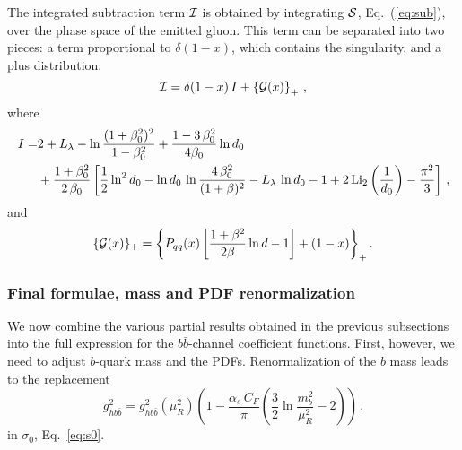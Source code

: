 The integrated subtraction term ${\cal I}$ is obtained by
integrating  ${\cal S}$, Eq.~(\ref{eq:sub}),  over the phase space of
the emitted gluon. This term can be separated into two pieces: a term
proportional to 
$\delta(1-x)$, which contains the singularity,
and a plus distribution:
\begin{equation}
  {\cal I} = \delta(1-x)\,I + \left\{ {\cal G}(x) \right\}_+\,,
\end{equation}
where
\begin{equation}
  \begin{split}
    I  = &2 +L_{\lambda}- \ln{\frac{(1+\beta_0^2)^2}{1-\beta_0^2}} +
    \frac{1-3\,\beta_0^2}{4\beta_0}\ln d_0\\
     &+\frac{1+\beta_0^2}{2\,\beta_0}
    \left[
      \frac{1}{2}\ln^2 d_0
      -\ln d_0\,\ln {\frac{4\,\beta_0^2}{(1+\beta)^2}}
      - L_{\lambda}\,\ln d_0 -1
      +2\,{\rm Li}_2\left(\frac{1}{d_0} \right)-\frac{\pi^2}{3}
    \right]\,,
  \end{split}
\end{equation}
and
\begin{equation}
  \{{\cal G}(x)\}_+ =  {\left\{P_{qq}(x)\left[ \frac{1+\beta^2}{2\beta}
        \ln{d} -1 \right] +
      \left( 1-x \right)\right\}}_{+}\,.
\end{equation}
\subsubsection{Final formulae, mass and PDF renormalization}
We now combine the various partial results obtained in the previous
subsections  into the  full expression for the $b\bar{b}$-channel
coefficient functions. First, however, we need to adjust 
$b$-quark mass and the PDFs.
Renormalization of the  $b$ mass leads to the   replacement
\begin{equation}
  g_{hb\bar{b}}^2 = g_{hb\bar{b}}^2(\mu_R^2) \left(
    1-\frac{\alpha_s\,C_F}{\pi}\left(
        \frac{3}{2}\ln\frac{m_b^2}{\mu_R^2}-2  \right) \right)\,.
\end{equation}
in $\sigma_0$, Eq.~\eqref{eq:s0}.

